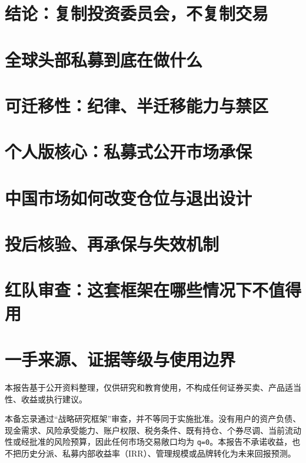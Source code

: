 \documentclass[a4paper,11pt,openany,fontset=none]{ctexrep}
\newcommand{\reportdisclaimer}{本报告基于公开资料整理，仅供研究和教育使用，不构成任何证券买卖、产品适当性、收益或执行建议。}
\begin{document}
\astockcover

\tableofcontents
\clearpage

\chapter{结论：复制投资委员会，不复制交易}


\chapter{全球头部私募到底在做什么}


\chapter{可迁移性：纪律、半迁移能力与禁区}


\chapter{个人版核心：私募式公开市场承保}


\chapter{中国市场如何改变仓位与退出设计}


\chapter{投后核验、再承保与失效机制}


\chapter{红队审查：这套框架在哪些情况下不值得用}


\appendix
\chapter{一手来源、证据等级与使用边界}


\clearpage
\thispagestyle{empty}
\vspace*{4cm}
\begin{disclosurebox}[重要披露]
\small
\reportdisclaimer\par
本备忘录通过“战略研究框架”审查，并不等同于实施批准。没有用户的资产负债、现金需求、风险承受能力、账户权限、税务条件、既有持仓、个券尽调、当前流动性或经批准的风险预算，因此任何市场交易敞口均为 \texttt{q=0}。本报告不承诺收益，也不把历史分派、私募内部收益率（IRR）、管理规模或品牌转化为未来回报预测。
\end{disclosurebox}
\end{document}
